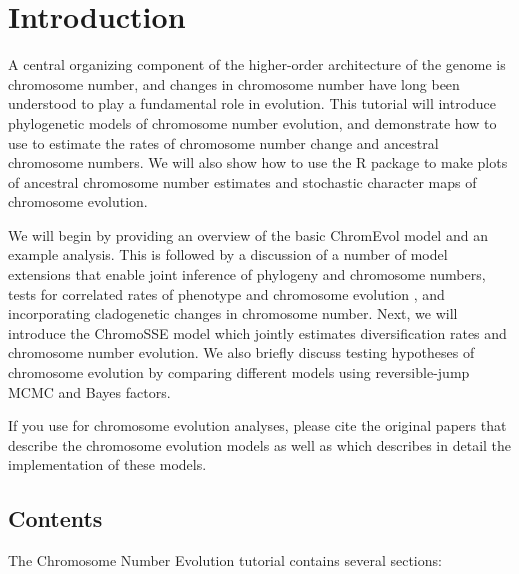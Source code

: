 \section*{Introduction}

A central organizing component of the higher-order architecture of the
genome is chromosome number, and changes in chromosome number have long
been understood to play a fundamental role in evolution.
This tutorial will introduce phylogenetic models of chromosome number evolution,
and demonstrate how to use \RevBayes 
to estimate the rates of chromosome number change and ancestral chromosome numbers.
We will also show how to use the \RevGadgets R package to make plots of ancestral
chromosome number estimates and stochastic character maps of chromosome evolution.

We will begin by providing an overview of the basic ChromEvol model \citep{mayrose2010probabilistic} and 
an example \RevBayes analysis. 
This is followed by a discussion of a number of model extensions 
that enable joint inference of phylogeny
and chromosome numbers, 
tests for correlated rates of phenotype and chromosome evolution \citep[the BiChroM model;][]{zenil2017testing},
and incorporating cladogenetic changes in chromosome number.
Next, we will introduce the ChromoSSE model \citep{freyman2016cladogenetic} which jointly
estimates diversification rates and chromosome number evolution.
We also briefly discuss testing hypotheses of chromosome evolution by
comparing different models using reversible-jump MCMC and Bayes factors.

If you use \RevBayes for chromosome evolution analyses, please cite the original 
papers that describe the chromosome evolution models as well as \citet{freyman2016cladogenetic}
which describes in detail the \RevBayes implementation of these models.

\subsection*{Contents}

The Chromosome Number Evolution tutorial contains several sections:

